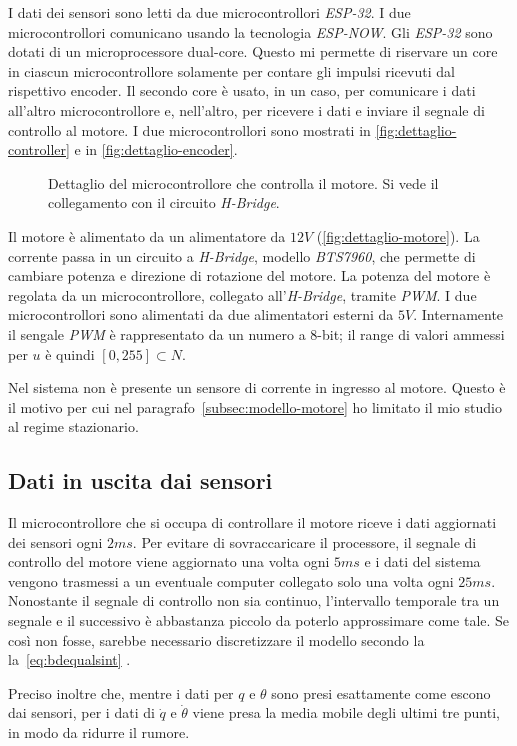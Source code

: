 I dati dei sensori sono letti da due microcontrollori \emph{ESP-32}.
I due microcontrollori comunicano usando la tecnologia \emph{ESP-NOW}.
Gli \emph{ESP-32} sono dotati di un microprocessore dual-core. Questo mi
permette di riservare un core in ciascun microcontrollore solamente per contare
gli impulsi ricevuti dal rispettivo encoder. Il secondo core è usato, in un caso,
per comunicare i dati all'altro microcontrollore e, nell'altro, per ricevere i dati
e inviare il segnale di controllo al motore. I due microcontrollori sono mostrati
in \autoref{fig:dettaglio-controller} e in \autoref{fig:dettaglio-encoder}.

\begin{figure}[h]
    \centering
    \caption[Dettaglio controller]{Dettaglio
    del microcontrollore che controlla il motore.
    Si vede il collegamento con il circuito
    \emph{H-Bridge}.}
    \label{fig:dettaglio-controller}
\end{figure}

Il motore è alimentato da un alimentatore da $12V$ (\autoref{fig:dettaglio-motore}).
La corrente passa in un circuito a \emph{H-Bridge}, modello \emph{BTS7960},
che permette di cambiare potenza e direzione di rotazione del motore.
La potenza del motore è regolata da un microcontrollore, collegato all'\emph{H-Bridge}, tramite \emph{PWM}\footnotemark. I due microcontrollori sono alimentati da due alimentatori esterni da $5V$. Internamente il sengale \emph{PWM} è rappresentato da un
numero a $8$-bit; il range di valori ammessi per $u$ è quindi $[0, 255] \subset N$.



Nel sistema non è presente un sensore di corrente in ingresso al motore.
Questo è il motivo per cui nel paragrafo~\ref{subsec:modello-motore} ho limitato
il mio studio al regime stazionario.

\subsection{Dati in uscita dai sensori}
Il microcontrollore che si occupa di controllare il motore riceve i dati
aggiornati dei sensori ogni $2ms$.
Per evitare di sovraccaricare il processore, il segnale di controllo
del motore viene aggiornato una volta ogni $5ms$ e i dati del sistema vengono
trasmessi a un eventuale computer collegato solo una volta ogni $25ms$.
Nonostante il segnale di controllo non sia continuo, l'intervallo temporale
tra un segnale e il successivo è abbastanza piccolo da poterlo approssimare come
tale. Se così non fosse, sarebbe necessario discretizzare
il modello secondo la la~\eqref{eq:bdequalsint} .

Preciso inoltre che, mentre i dati per $q$ e $\theta$ sono presi esattamente
come escono dai sensori, per i dati di $\dot q$ e $\dot \theta$ viene presa
la media mobile degli ultimi tre punti, in modo da ridurre il rumore.